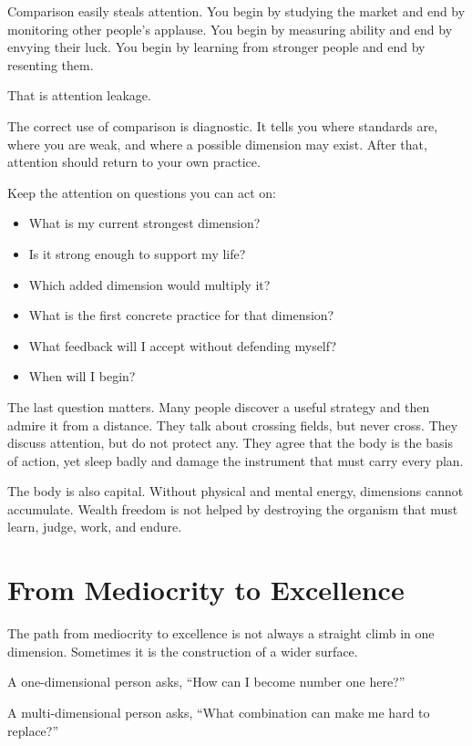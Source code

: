 Comparison easily steals attention. You begin by studying the market and end by monitoring other people's applause. You begin by measuring ability and end by envying their luck. You begin by learning from stronger people and end by resenting them.

That is attention leakage.

The correct use of comparison is diagnostic. It tells you where standards are, where you are weak, and where a possible dimension may exist. After that, attention should return to your own practice.

Keep the attention on questions you can act on:

\begin{itemize}
\item What is my current strongest dimension?
\item Is it strong enough to support my life?
\item Which added dimension would multiply it?
\item What is the first concrete practice for that dimension?
\item What feedback will I accept without defending myself?
\item When will I begin?
\end{itemize}

The last question matters. Many people discover a useful strategy and then admire it from a distance. They talk about crossing fields, but never cross. They discuss attention, but do not protect any. They agree that the body is the basis of action, yet sleep badly and damage the instrument that must carry every plan.

The body is also capital. Without physical and mental energy, dimensions cannot accumulate. Wealth freedom is not helped by destroying the organism that must learn, judge, work, and endure.

\section*{From Mediocrity to Excellence}

The path from mediocrity to excellence is not always a straight climb in one dimension. Sometimes it is the construction of a wider surface.

A one-dimensional person asks, ``How can I become number one here?''

A multi-dimensional person asks, ``What combination can make me hard to replace?''

